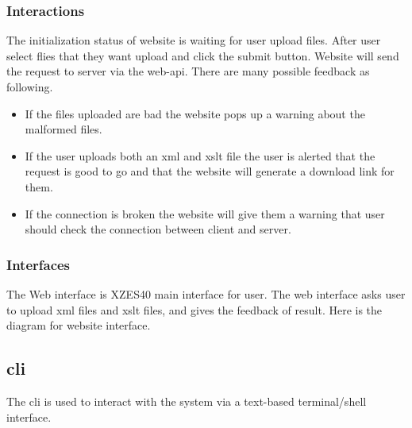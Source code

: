 \begin{enmerate}
\begin{itemzie}
\subsubsection{Interactions}

The initialization status of website is waiting for user upload files.
After user select flies that they want upload and click the submit button.
Website will send the request to server via the \gls{web-api}.
There are many possible feedback as following.

\begin{itemize}
    \item If the files uploaded are bad the website pops up a warning about the malformed files.
    \item  If the user uploads both an \gls{xml} and \gls{xslt} file the user is alerted that the request is good to go and that the website will generate a download link for them.
    \item If the connection is broken the website will give them a warning that user should check the connection between client and server.
\end{itemize}

\subsubsection{Interfaces}

The Web interface is XZES40 main interface for user.
The web interface asks user to upload \gls{xml} files and \gls{xslt} files, and gives the feedback of result.
Here is the diagram for website interface.


\subsection{\gls{cli}}
\label{cli}

The \gls{cli} is used to interact with the system via a text-based terminal/shell interface.


\end{itemzie}
\end{enmerate}

